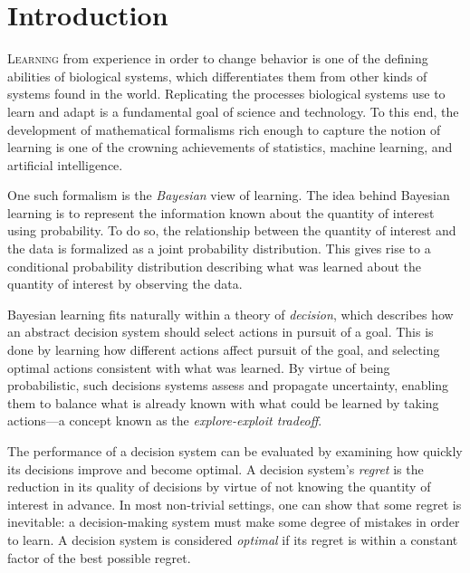 \documentclass[11pt]{book}
\begin{document}
\tableofcontents

\listoffigures





\chapter{Introduction}
\label{ch:intro}

\lettrine{L}{earning} from experience in order to change behavior is one of the defining abilities of biological systems, which differentiates them from other kinds of systems found in the world.
Replicating the processes biological systems use to learn and adapt is a fundamental goal of science and technology.
To this end, the development of mathematical formalisms rich enough to capture the notion of learning is one of the crowning achievements of statistics, machine learning, and artificial intelligence.

One such formalism is the \emph{Bayesian} view of learning.
The idea behind Bayesian learning is to represent the information known about the quantity of interest using probability.
To do so, the relationship between the quantity of interest and the data is formalized as a joint probability distribution.
This gives rise to a conditional probability distribution describing what was learned about the quantity of interest by observing the data.

Bayesian learning fits naturally within a theory of \emph{decision}, which describes how an abstract decision system should select actions in pursuit of a goal.
This is done by learning how different actions affect pursuit of the goal, and selecting optimal actions consistent with what was learned.
By virtue of being probabilistic, such decisions systems assess and propagate uncertainty, enabling them to balance what is already known with what could be learned by taking actions---a concept known as the \emph{explore-exploit tradeoff}.

The performance of a decision system can be evaluated by examining how quickly its decisions improve and become optimal.
A decision system's \emph{regret} is the reduction in its quality of decisions by virtue of not knowing the quantity of interest in advance.
In most non-trivial settings, one can show that some regret is inevitable: a decision-making system must make some degree of mistakes in order to learn.
A decision system is considered \emph{optimal} if its regret is within a constant factor of the best possible regret.
\end{document}
